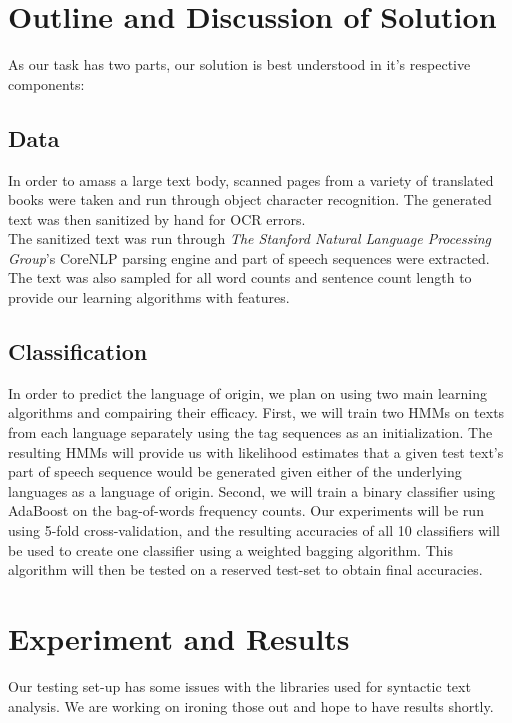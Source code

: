 \documentclass[11pt,letterpaper]{article}
\begin{document}
\section{Outline and Discussion of Solution} As our task has two parts, our
solution is best understood in it's respective components: 

\subsection{Data} In order to amass a large text body, scanned pages from a
variety of translated books were taken and run through object character
recognition.  The generated text was then sanitized by hand for OCR errors.\\

The sanitized text was run through {\it The Stanford Natural Language
Processing Group}'s CoreNLP parsing engine and part of speech sequences were
extracted.  The text was also sampled for all word counts and sentence count
length to provide our learning algorithms with features.

\subsection{Classification} In order to predict the language of origin, we plan
on using two main learning algorithms and compairing their efficacy.  First, we
will train two HMMs on texts from each language separately using the tag
sequences as an initialization.  The resulting HMMs will provide us with
likelihood estimates that a given test text's part of speech sequence would be
generated given either of the underlying languages as a language of origin.
Second, we will train a binary classifier using AdaBoost on the bag-of-words
frequency counts.  Our experiments will be run using 5-fold cross-validation,
and the resulting accuracies of all 10 classifiers will be used to create one
classifier using a weighted bagging algorithm.  This algorithm will then be
tested on a reserved test-set to obtain final accuracies.

\section{Experiment and Results} Our testing set-up has some issues with the
libraries used for syntactic text analysis.  We are working on ironing those
out and hope to have results shortly.
\end{document}
